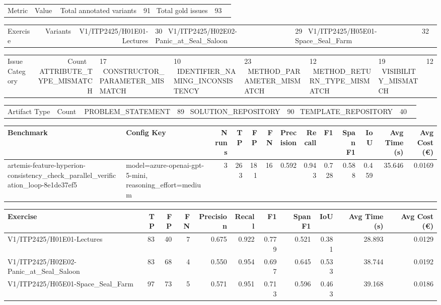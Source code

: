 \begin{tabular}{lr}
Metric & Value \
\hline
Total annotated variants & 91 \
Total gold issues & 93 \
\end{tabular}

\begin{tabular}{lr}
Exercise & Variants \
\hline
V1/ITP2425/H01E01-Lectures & 30 \
V1/ITP2425/H02E02-Panic\_at\_Seal\_Saloon & 29 \
V1/ITP2425/H05E01-Space\_Seal\_Farm & 32 \
\end{tabular}

\begin{tabular}{lr}
Issue Category & Count \
\hline
ATTRIBUTE\_TYPE\_MISMATCH & 17 \
CONSTRUCTOR\_PARAMETER\_MISMATCH & 10 \
IDENTIFIER\_NAMING\_INCONSISTENCY & 23 \
METHOD\_PARAMETER\_MISMATCH & 12 \
METHOD\_RETURN\_TYPE\_MISMATCH & 19 \
VISIBILITY\_MISMATCH & 12 \
\end{tabular}

\begin{tabular}{lr}
Artifact Type & Count \
\hline
PROBLEM\_STATEMENT & 89 \
SOLUTION\_REPOSITORY & 90 \
TEMPLATE\_REPOSITORY & 40 \
\end{tabular}

\begin{tabular}{llrrrrrrrrrrr}
Benchmark & Config Key & N runs & TP & FP & FN & Precision & Recall & F1 & Span F1 & IoU & Avg Time (s) & Avg Cost (€) \\
\hline
artemis-feature-hyperion-consistency\_check\_parallel\_verification\_loop-8e1de37ef5 & model=azure-openai-gpt-5-mini, reasoning\_effort=medium & 3 & 263 & 181 & 16 & 0.592 & 0.943 & 0.728 & 0.588 & 0.459 & 35.646 & 0.0169 \\
\end{tabular}

\begin{tabular}{lrrrrrrrrrr}
Exercise & TP & FP & FN & Precision & Recall & F1 & Span F1 & IoU & Avg Time (s) & Avg Cost (€) \\
\hline
V1/ITP2425/H01E01-Lectures & 83 & 40 & 7 & 0.675 & 0.922 & 0.779 & 0.521 & 0.381 & 28.893 & 0.0129 \\
V1/ITP2425/H02E02-Panic\_at\_Seal\_Saloon & 83 & 68 & 4 & 0.550 & 0.954 & 0.697 & 0.645 & 0.533 & 38.744 & 0.0192 \\
V1/ITP2425/H05E01-Space\_Seal\_Farm & 97 & 73 & 5 & 0.571 & 0.951 & 0.713 & 0.596 & 0.463 & 39.168 & 0.0186 \\
\end{tabular}
